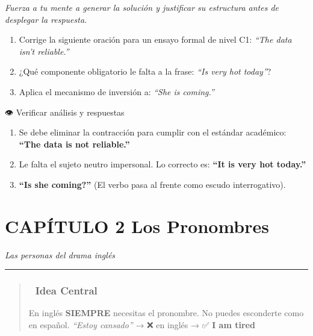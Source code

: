 \documentclass[
  spanish,
  letterpaper,
]{scrbook}
\providecommand{\tightlist}{%
  \setlength{\itemsep}{0pt}\setlength{\parskip}{0pt}}
\begin{document}
\begin{tcolorbox}[enhanced jigsaw, opacityback=0, toptitle=1mm, toprule=.15mm, leftrule=.75mm, colframe=quarto-callout-note-color-frame, coltitle=black, opacitybacktitle=0.6, rightrule=.15mm, titlerule=0mm, bottomtitle=1mm, arc=.35mm, left=2mm, colback=white, breakable, bottomrule=.15mm, title={📝 Mini ejercicio mental}, colbacktitle=quarto-callout-note-color!10!white]

\emph{Fuerza a tu mente a generar la solución y justificar su estructura
antes de desplegar la respuesta.}

\begin{enumerate}
\def\labelenumi{\arabic{enumi}.}
\tightlist
\item
  Corrige la siguiente oración para un ensayo formal de nivel C1:
  \emph{``The data isn't reliable.''}
\item
  ¿Qué componente obligatorio le falta a la frase: \emph{``Is very hot
  today''}?
\item
  Aplica el mecanismo de inversión a: \emph{``She is coming.''}
\end{enumerate}

👁️ Verificar análisis y respuestas

\begin{enumerate}
\def\labelenumi{\arabic{enumi}.}
\tightlist
\item
  Se debe eliminar la contracción para cumplir con el estándar
  académico: \textbf{``The data is not reliable.''}
\item
  Le falta el sujeto neutro impersonal. Lo correcto es: \textbf{``It is
  very hot today.''}
\item
  \textbf{``Is she coming?''} (El verbo pasa al frente como escudo
  interrogativo).
\end{enumerate}

\end{tcolorbox}

\chapter{CAPÍTULO 2 Los Pronombres}\label{capuxedtulo-2-los-pronombres}

\emph{Las personas del drama inglés}

\begin{center}\rule{0.5\linewidth}{0.5pt}\end{center}

\begin{quote}
\subsection{🎯 Idea Central}\label{idea-central}

En inglés \textbf{SIEMPRE} necesitas el pronombre. No puedes esconderte
como en español. \emph{``Estoy cansado''} → ❌ en inglés → ✅ \textbf{I
am tired}
\end{quote}
\end{document}
